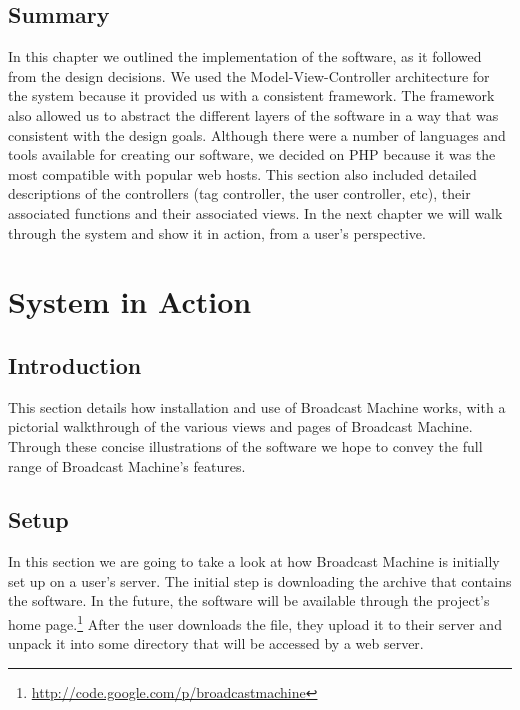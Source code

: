 \documentclass[a4paper,12pt]{report}
\begin{document}
\section{Summary}
In this chapter we outlined the implementation of the software, as it followed from the design decisions. We used the 
Model-View-Controller architecture for the system because it provided us with a consistent framework. The framework also allowed us to 
abstract the different layers of the software in a way that was consistent with the design goals. Although there were a number of 
languages and tools available for creating our software, we decided on PHP because it was the most compatible with popular web hosts. This 
section also included detailed descriptions of the controllers (tag controller, the user controller, etc), their associated functions and 
their associated views. In the next chapter we will walk through the system and show it in action, from a user's perspective. 

\chapter{System in Action}

\section{Introduction}
This section details how installation and use of Broadcast Machine works, with a pictorial walkthrough of the various views and pages of Broadcast Machine. 
Through these concise illustrations of the software we hope to convey the full range of Broadcast Machine's features.

\section{Setup}
In this section we are going to take a look at how Broadcast Machine is initially set up on a user's server.
The initial step is downloading the archive that contains the software.
In the future, the software will be available through the project's home page.\footnote{\url{http://code.google.com/p/broadcastmachine}}
After the user downloads the file, they upload it to their server and unpack it into some directory that will be accessed by a web server.
\end{document}
